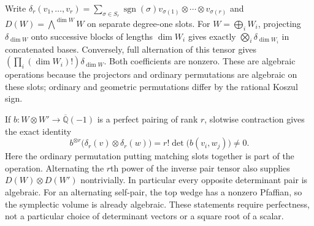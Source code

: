 \documentclass[11pt]{article}
\newcommand{\kk}{{\overline{\mathbb Q}}}
\theoremstyle{remark}
\begin{document}
Write $\delta_r(v_1,\ldots,v_r)=
\sum_{\sigma\in S_r}\operatorname{sgn}(\sigma)
v_{\sigma(1)}\otimes\cdots\otimes v_{\sigma(r)}$ and
$D(W)=\bigwedge^{\dim W}W$ on separate degree-one slots.
For $W=\bigoplus_i W_i$, projecting $\delta_{\dim W}$ onto successive
blocks of lengths $\dim W_i$ gives exactly
$\bigotimes_i\delta_{\dim W_i}$ in concatenated bases.
Conversely, full alternation of this tensor gives
$\left(\prod_i(\dim W_i)!\right)\delta_{\dim W}$.
Both coefficients are nonzero. These are algebraic operations because
the projectors and ordinary permutations are algebraic on these slots;
ordinary and geometric permutations differ by the rational Koszul sign.

If $b:W\otimes W'\to\kk(-1)$ is a perfect pairing of rank $r$,
slotwise contraction gives the exact identity
\[
 b^{\otimes r}\bigl(\delta_r(v)\otimes\delta_r(w)\bigr)
       =r!\det\bigl(b(v_i,w_j)\bigr)\ne0.
 \tag{4}\label{eq:det-contract}
\]
Here the ordinary permutation putting matching slots together is part of
the operation. Alternating the $r$th power of the inverse pair tensor
also supplies $D(W)\otimes D(W')$ nontrivially. In particular every
opposite determinant pair is algebraic. For an alternating self-pair,
the top wedge has a nonzero Pfaffian, so the symplectic volume is already
algebraic. These statements require perfectness, not a particular
choice of determinant vectors or a square root of a scalar.
\end{document}
